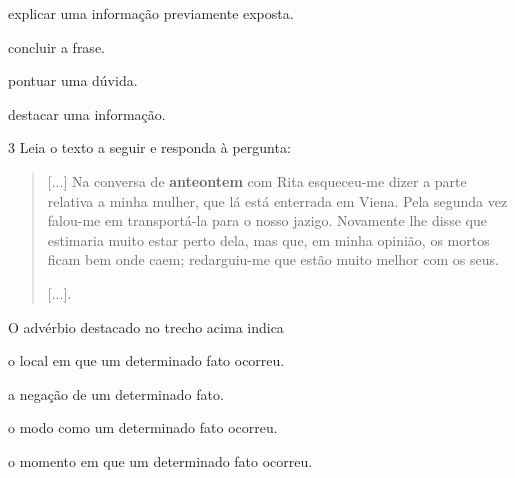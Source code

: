 \begin{escolha}
\item explicar uma informação previamente exposta.

\item concluir a frase.

\item pontuar uma dúvida.

\item destacar uma informação.
\end{escolha}


\num{3} Leia o texto a seguir e responda à pergunta:

\begin{quote}
{[}...{]} Na conversa de \textbf{anteontem} com Rita esqueceu-me dizer
a parte relativa a minha mulher, que lá está enterrada em Viena. Pela
segunda vez falou-me em transportá-la para o nosso jazigo. Novamente lhe
disse que estimaria muito estar perto dela, mas que, em minha opinião,
os mortos ficam bem onde caem; redarguiu-me que estão muito melhor com
os seus.

{[}...{]}.

\end{quote}

O advérbio destacado no trecho acima indica

\begin{escolha}
\item o local em que um determinado fato ocorreu.

\item a negação de um determinado fato.

\item o modo como um determinado fato ocorreu.

\item o momento em que um determinado fato ocorreu.
\end{escolha}

